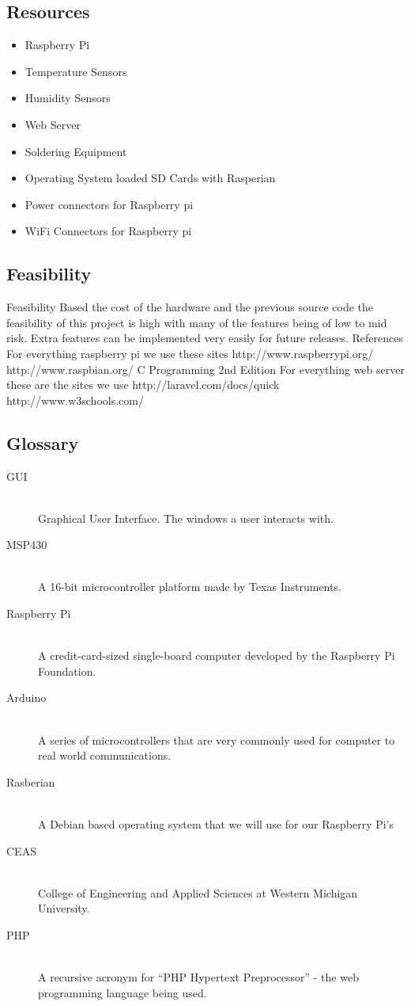 \documentclass{report}
\begin{document}
\subsection*{Resources}
\begin{itemize}
\item Raspberry Pi
\item Temperature Sensors
\item Humidity Sensors
\item Web Server
\item Soldering Equipment
\item Operating System loaded SD Cards with Rasperian
\item Power connectors for Raspberry pi
\item WiFi Connectors for Raspberry pi
\end{itemize}
\newpage
\subsection*{Feasibility}
Feasibility
	Based the cost of the hardware and the previous source code the feasibility of this project is high with many of the features being of low to mid risk. Extra features can be implemented very easily for future releases.
References
	For everything raspberry pi we use these sites
http://www.raspberrypi.org/
http://www.raspbian.org/
C Programming 2nd Edition
For everything web server these are the sites we use
	http://laravel.com/docs/quick
http://www.w3schools.com/
\newpage
\subsection*{Glossary}
\begin{description}
\item [GUI] \hfill \\
Graphical User Interface. The windows a user interacts with.
\item [MSP430] \hfill \\
A 16-bit microcontroller platform made by Texas Instruments.
\item [Raspberry Pi] \hfill \\
 A credit-card-sized single-board computer developed by the Raspberry Pi Foundation.
\item [Arduino] \hfill \\
A series of microcontrollers that are very commonly used for computer to real world communications.
\item [Rasberian] \hfill \\
 A Debian based operating system that we will use for our Raspberry Pi’s
\item [CEAS] \hfill \\
College of Engineering and Applied Sciences at Western Michigan University.
\item [PHP] \hfill \\
A recursive acronym for “PHP Hypertext Preprocessor” - the web programming language being used.
\end{description}
\newpage
\end{document}
